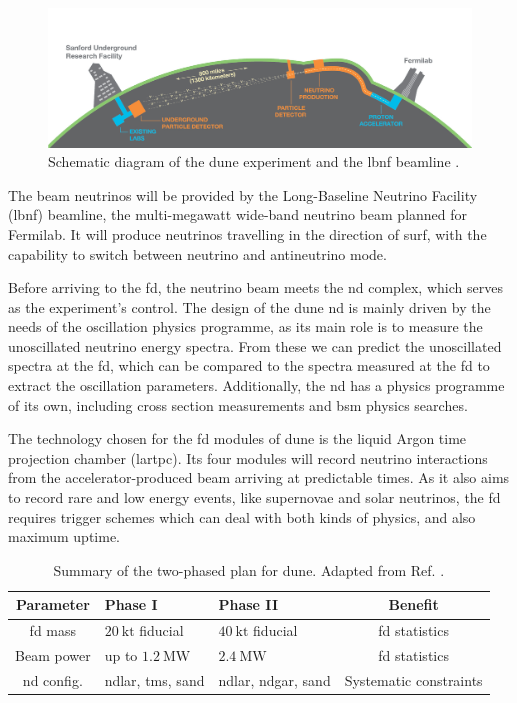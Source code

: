 \begin{figure}[t]
	\centering
	\includegraphics[width=0.9\linewidth]{Images/DUNE/FD/dune}
	\caption[Schematic diagram of the \gls{dune} experiment and the \gls{lbnf} beamline.]{Schematic diagram of the \gls{dune} experiment and the \gls{lbnf} beamline \cite{DUNE2020TDR1}.}
	\label{fig:dune}
\end{figure}

The beam neutrinos will be provided by the Long-Baseline Neutrino Facility (\gls{lbnf}) beamline, the multi-megawatt wide-band neutrino beam planned for Fermilab. It will produce neutrinos travelling in the direction of \gls{surf}, with the capability to switch between neutrino and antineutrino mode.

Before arriving to the \gls{fd}, the neutrino beam meets the \gls{nd} complex, which serves as the experiment's control. The design of the \gls{dune} \gls{nd} is mainly driven by the needs of the oscillation physics programme, as its main role is to measure the unoscillated neutrino energy spectra. From these we can predict the unoscillated spectra at the \gls{fd}, which can be compared to the spectra measured at the \gls{fd} to extract the oscillation parameters. Additionally, the \gls{nd} has a physics programme of its own, including cross section measurements and \gls{bsm} physics searches.

The technology chosen for the \gls{fd} modules of \gls{dune} is the liquid Argon time projection chamber (\gls{lartpc}). Its four modules will record neutrino interactions from the accelerator-produced beam arriving at predictable times. As it also aims to record rare and low energy events, like supernovae and solar neutrinos, the \gls{fd} requires trigger schemes which can deal with both kinds of physics, and also maximum uptime.

\begin{table}[]
	\caption[Summary of the two-phased plan for \gls{dune}.]{Summary of the two-phased plan for \gls{dune}. Adapted from Ref. \cite{DUNE2022Snowmass}.}
	\centering
	\begin{tabular}{c|C{3.0cm}|C{3.0cm}|c}
	Parameter  & Phase I                     & Phase II		& Benefit \\[1mm] \hline
	\rule{0pt}{1.1\normalbaselineskip}\gls{fd} mass    & $20 \ \mathrm{kt}$ fiducial & $40 \ \mathrm{kt}$ fiducial & \gls{fd} statistics\\[1mm]
	Beam power & up to $1.2 \ \mathrm{MW}$   & $2.4 \ \mathrm{MW}$      & \gls{fd} statistics  \\[1mm]
	\gls{nd} config.  & \gls{ndlar}, \gls{tms}, \gls{sand}           & \gls{ndlar}, \gls{ndgar}, \gls{sand} & Systematic constraints
	\end{tabular}
	\label{tab:dune_phases}
\end{table}

